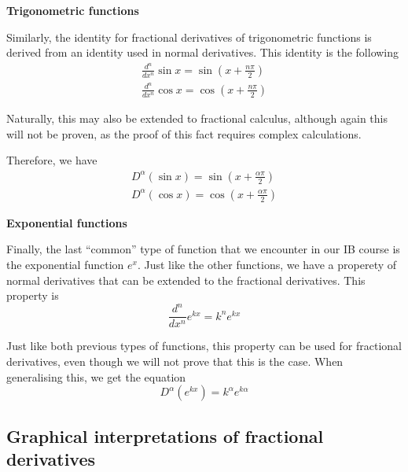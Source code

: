 \documentclass{article}
\begin{document}
\textbf{Trigonometric functions}

Similarly, the identity for fractional derivatives of trigonometric functions
is derived from an identity used in normal derivatives. This identity is the
following
\begin{gather*}
\frac{d^n}{dx^n} \sin{x} = \sin\left(x + \frac{n\pi}{2}\right) \\
\frac{d^n}{dx^n} \cos{x} = \cos\left(x + \frac{n\pi}{2}\right)
\end{gather*}
\parencite{simplybeautifulart2016}

Naturally, this may also be extended to fractional calculus, although again
this will not be proven, as the proof of this fact requires complex
calculations.

Therefore, we have
\begin{gather*}
D^\alpha \left(\sin{x}\right) = \sin\left(x + \frac{\alpha\pi}{2}\right) \\
D^\alpha \left(\cos{x}\right) = \cos\left(x + \frac{\alpha\pi}{2}\right)
\end{gather*}

\textbf{Exponential functions}

Finally, the last ``common'' type of function that we encounter in our IB
course is the exponential function $e^x$. Just like the other functions, we
have a properety of normal derivatives that can be extended to the fractional
derivatives. This property is
$$
\frac{d^n}{dx^n} e^{kx} = k^ne^{kx}
$$
\parencite{dietrich2023}

Just like both previous types of functions, this property can be used for
fractional derivatives, even though we will not prove that this is the case.
When generalising this, we get the equation
$$
D^\alpha \left(e^{kx}\right) = k^\alpha e^{k\alpha}
$$

\subsection{Graphical interpretations of fractional derivatives}
\end{document}
